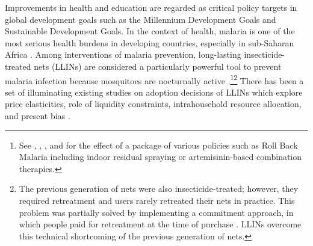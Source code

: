 \documentclass[fleqn,11pt]{article}
\begin{document}



Improvements in health and education are regarded as critical policy targets in global development goals such as the Millennium Development Goals and Sustainable Development Goals. In the context of health, malaria is one of the most serious health burdens in developing countries, especially in sub-Saharan Africa \citep{rowe_burden_2006}. Among interventions of malaria prevention, long-lasting insecticide-treated nets (LLINs) are considered a particularly powerful tool to prevent malaria infection because mosquitoes are nocturnally active \citep{lengeler_insecticide-treated_2006,sumitomo-chemical_olyset_2010,bhatt_effect_2015,pryce_insecticide-treated_2018,maskin_economics_2019}.\footnote{See \citet{bleakley_malaria_2010}, \citet{lucas_malaria_2010}, \citet{cutler_early-life_2010}, \citet{barofsky_malaria_2015} and \citet{kuecken_disease_2021} for the effect of a package of various policies such as Roll Back Malaria including indoor residual spraying or artemisinin-based combination therapies. }\footnote{The previous generation of nets were also insecticide-treated; however, they required retreatment and users rarely retreated their nets in practice. This problem was partially solved by implementing a commitment approach, in which people paid for retreatment at the time of purchase \citep{tarozzi_micro-loans_2014}. LLINs overcome this technical shortcoming of the previous generation of nets.} There has been a set of illuminating existing studies on adoption decisions of LLINs which explore price elasticities, role of liquidity constraints, intrahousehold resource allocation, and present bias \citep{blackburn_bednets_2008,hoffmann_intrahousehold_2009,cohen_free_2010,tarozzi_micro-loans_2014,dupas_short-run_2014,mahajan_identification_2020}. 
\end{document}

